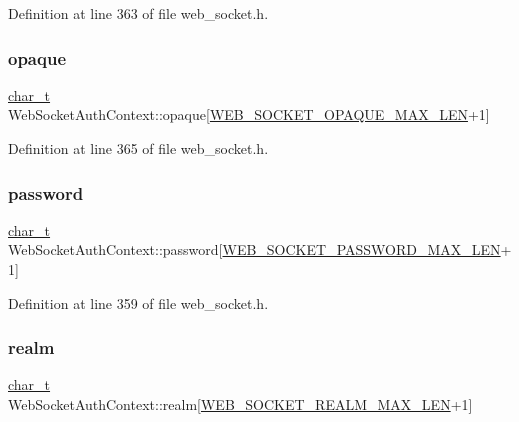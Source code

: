 Definition at line 363 of file web\+\_\+socket.\+h.

\mbox{\label{structWebSocketAuthContext_aea6c6e4970c40b250d06dc458f142dd5}} 
\subsubsection{\texorpdfstring{opaque}{opaque}}
{\footnotesize\ttfamily \hyperlink{compiler__port_8h_a40bb5262bf908c328fbcfbe5d29d0201}{char\+\_\+t} Web\+Socket\+Auth\+Context\+::opaque\mbox{[}\hyperlink{web__socket_8h_a1703dd1ad84a33246b072ed9a3042d5f}{W\+E\+B\+\_\+\+S\+O\+C\+K\+E\+T\+\_\+\+O\+P\+A\+Q\+U\+E\+\_\+\+M\+A\+X\+\_\+\+L\+EN}+1\mbox{]}}



Definition at line 365 of file web\+\_\+socket.\+h.

\mbox{\label{structWebSocketAuthContext_af6fc321cd2597378b1086cfe03858830}} 
\subsubsection{\texorpdfstring{password}{password}}
{\footnotesize\ttfamily \hyperlink{compiler__port_8h_a40bb5262bf908c328fbcfbe5d29d0201}{char\+\_\+t} Web\+Socket\+Auth\+Context\+::password\mbox{[}\hyperlink{web__socket_8h_a4c69773275a97b429a126bce01074215}{W\+E\+B\+\_\+\+S\+O\+C\+K\+E\+T\+\_\+\+P\+A\+S\+S\+W\+O\+R\+D\+\_\+\+M\+A\+X\+\_\+\+L\+EN}+1\mbox{]}}



Definition at line 359 of file web\+\_\+socket.\+h.

\mbox{\label{structWebSocketAuthContext_ae54b0e674cf0be7223519ecb9ff9c9cd}} 
\subsubsection{\texorpdfstring{realm}{realm}}
{\footnotesize\ttfamily \hyperlink{compiler__port_8h_a40bb5262bf908c328fbcfbe5d29d0201}{char\+\_\+t} Web\+Socket\+Auth\+Context\+::realm\mbox{[}\hyperlink{web__socket_8h_ae74a00b949ab02514b90f9783031b311}{W\+E\+B\+\_\+\+S\+O\+C\+K\+E\+T\+\_\+\+R\+E\+A\+L\+M\+\_\+\+M\+A\+X\+\_\+\+L\+EN}+1\mbox{]}}



